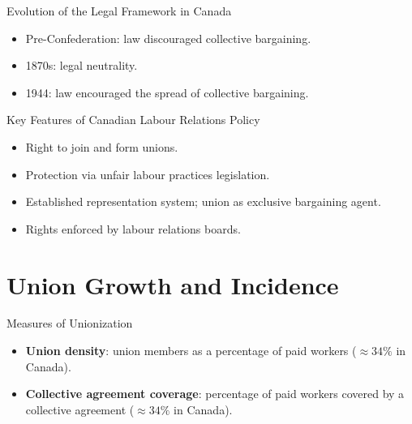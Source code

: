 \documentclass[aspectratio=169]{beamer}
\begin{document}
\begin{frame}{Evolution of the Legal Framework in Canada}
\transfade
\begin{itemize}[<+->]
  \item Pre-Confederation: law discouraged collective bargaining.
  \item 1870s: legal neutrality.
  \item 1944: law encouraged the spread of collective bargaining.
\end{itemize}
\end{frame}

\begin{frame}{Key Features of Canadian Labour Relations Policy}
\transfade
\begin{itemize}[<+->]
  \item Right to join and form unions.
  \item Protection via unfair labour practices legislation.
  \item Established representation system; union as exclusive bargaining agent.
  \item Rights enforced by labour relations boards.
\end{itemize}
\end{frame}

\section{Union Growth and Incidence}

\begin{frame}{Measures of Unionization}
\transfade
\begin{itemize}[<+->]
  \item \textbf{Union density}: union members as a percentage of paid workers (\(\approx 34\%\) in Canada).
  \item \textbf{Collective agreement coverage}: percentage of paid workers covered by a collective agreement (\(\approx 34\%\) in Canada).
\end{itemize}
\end{frame}
\end{document}

